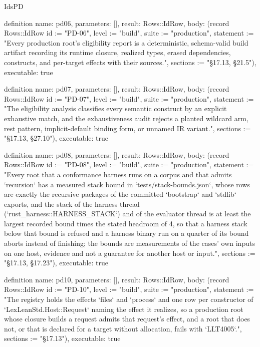 \begin{lexlean}{IdsPD}
\begin{semanticmodule}
definition{
  name: pd06,
  parameters: [],
  result: Rows::IdRow,
  body: (record Rows::IdRow {id := "PD-06", level := "build", suite := "production", statement := "Every production root's eligibility report is a deterministic, schema-valid build artifact recording its runtime closure, realized types, erased dependencies, constructs, and per-target effects with their sources.", sections := "§17.13, §21.5"}),
  executable: true
}

definition{
  name: pd07,
  parameters: [],
  result: Rows::IdRow,
  body: (record Rows::IdRow {id := "PD-07", level := "build", suite := "production", statement := "The eligibility analysis classifies every semantic construct by an explicit exhaustive match, and the exhaustiveness audit rejects a planted wildcard arm, rest pattern, implicit-default binding form, or unnamed IR variant.", sections := "§17.13, §27.10"}),
  executable: true
}

definition{
  name: pd08,
  parameters: [],
  result: Rows::IdRow,
  body: (record Rows::IdRow {id := "PD-08", level := "build", suite := "production", statement := "Every root that a conformance harness runs on a corpus and that admits `recursion` has a measured stack bound in `tests/stack-bounds.json`, whose rows are exactly the recursive packages of the committed `bootstrap` and `stdlib` exports, and the stack of the harness thread (`rust_harness::HARNESS_STACK`) and of the evaluator thread is at least the largest recorded bound times the stated headroom of 4, so that a harness stack below that bound is refused and a harness binary run on a quarter of its bound aborts instead of finishing; the bounds are measurements of the cases' own inputs on one host, evidence and not a guarantee for another host or input.", sections := "§17.13, §17.23"}),
  executable: true
}

definition{
  name: pd10,
  parameters: [],
  result: Rows::IdRow,
  body: (record Rows::IdRow {id := "PD-10", level := "build", suite := "production", statement := "The registry holds the effects `files` and `process` and one row per constructor of `LexLeanStd.Host::Request` naming the effect it realizes, so a production root whose closure builds a request admits that request's effect, and a root that does not, or that is declared for a target without allocation, fails with `LLT4005`.", sections := "§17.13"}),
  executable: true
}
\end{semanticmodule}
\end{lexlean}
